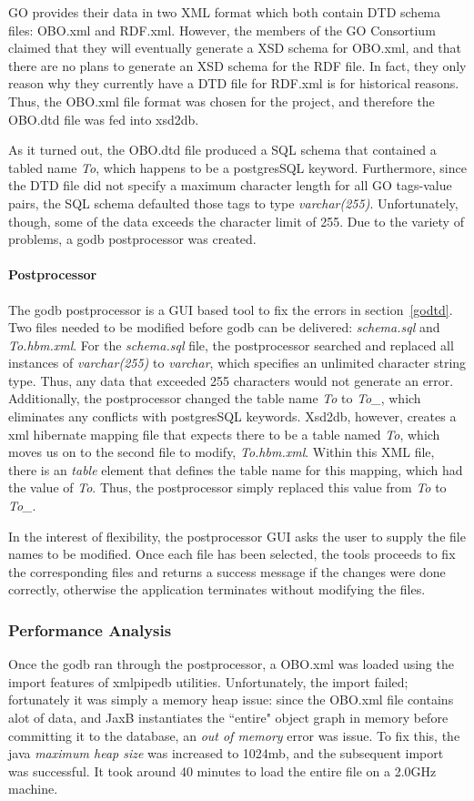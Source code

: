 GO provides their data in two XML format which both contain DTD schema files: OBO.xml and RDF.xml. However,
the members of the GO Consortium claimed that they will eventually generate a XSD schema for OBO.xml, and that there
are no plans to generate an XSD schema for the RDF file. In fact, they only reason why they currently have a DTD file
for RDF.xml is for historical reasons. Thus, the OBO.xml file format
was chosen for the project, and therefore the OBO.dtd file was fed into xsd2db.

As it turned out, the OBO.dtd file produced a SQL schema that contained a tabled name \emph{To}, which happens to be
a postgresSQL keyword. Furthermore, since the DTD file did not specify a maximum character length for all GO tags-value
pairs, the SQL schema defaulted those tags to type \emph{varchar(255)}. Unfortunately, though, some of the data exceeds the
character limit of 255. Due to the variety of problems, a godb postprocessor was created.

\paragraph{Postprocessor}
The godb postprocessor is a GUI based tool to fix the errors in section~\ref{godtd}. Two files needed to be modified  before
godb can be delivered: \emph{schema.sql} and \emph{To.hbm.xml}. For the \emph{schema.sql} file, the postprocessor
searched and replaced all instances of \emph{varchar(255)} to \emph{varchar}, which specifies an unlimited character string type.
Thus, any data that exceeded 255 characters would not generate an error. Additionally,
the postprocessor changed the table name \emph{To} to  \emph{To\_}, which eliminates any conflicts with postgresSQL keywords.
Xsd2db, however,
creates a xml hibernate mapping file that expects there to be a table named \emph{To}, which moves us on to the second file to modify,
\emph{To.hbm.xml}. Within this XML file, there is an \emph{table} element that defines the table name for this mapping, which had the
value of \emph{To}. Thus, the postprocessor simply replaced this value from \emph{To} to \emph{To\_}.

In the interest of flexibility, the postprocessor GUI asks the user to supply the file names to be modified.
Once each file has been selected, the tools proceeds to fix the corresponding files and returns a success message
if the changes were done correctly, otherwise the application terminates without modifying the files.

\subsubsection{Performance Analysis}
Once the godb ran through the postprocessor, a OBO.xml was loaded using the import features of xmlpipedb utilities.
Unfortunately, the import failed; fortunately it was simply a memory heap issue: since the OBO.xml file contains alot of data, and
JaxB instantiates the ``entire" object graph in memory before committing it to the database, an \emph{out of memory} error was issue.
To fix this, the java \emph{maximum heap size} was increased to 1024mb, and the subsequent import was successful. It took
around 40 minutes to load the entire file on a 2.0GHz machine.


